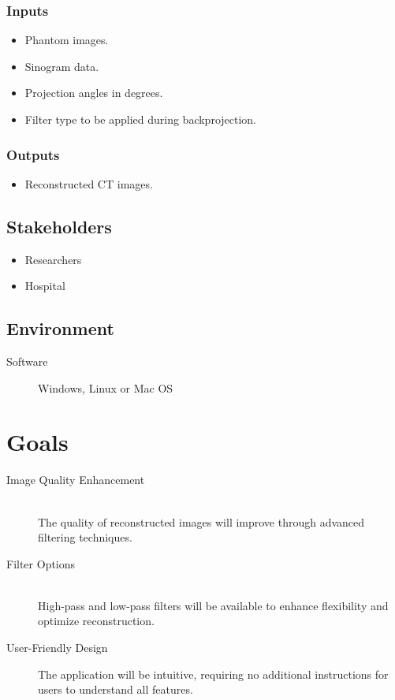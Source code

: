 \documentclass{article}
\begin{document}
\subsubsection{Inputs}
\begin{itemize}
\item Phantom images.
\item Sinogram data.
\item Projection angles in degrees.
\item Filter type to be applied during backprojection.
\end{itemize}

\subsubsection{Outputs}
\begin{itemize}
  \item Reconstructed CT images.
\end{itemize}

\subsection{Stakeholders}
\begin{itemize}
\item Researchers
\item Hospital
\end{itemize}

\subsection{Environment}
\begin{description}
\item[Software] Windows, Linux or Mac OS
\end{description}

\section{Goals}
\begin{description}
\item[Image Quality Enhancement] \hfill \\ The quality of reconstructed images will
  improve through advanced filtering techniques.
\item[Filter Options] \hfill \\ High-pass and low-pass filters will be available to
  enhance flexibility and optimize reconstruction.
\item[User-Friendly Design] \hfill \newline The application will be intuitive, requiring
  no additional instructions for users to understand all features.
\end{description}
\end{document}
